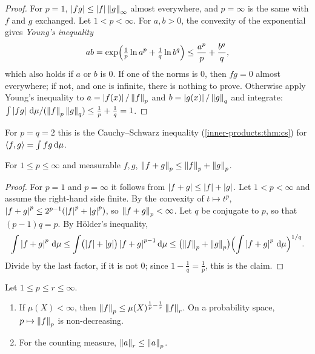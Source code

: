 \begin{notechapter}
\begin{proof}
For $p = 1$, $\left|fg\right|\leq\left|f\right|\left\|g\right\|_\infty$ almost everywhere, and
$p = \infty$ is the same with $f$ and $g$ exchanged. Let
$1 < p < \infty$. For $a, b > 0$, the convexity of the exponential
gives \emph{Young's inequality}
\[
  ab = \exp\Bigl(\tfrac1p\ln a^p + \tfrac1q\ln b^q\Bigr)
  \leq\frac{a^p}p + \frac{b^q}q ,
\]
which also holds if $a$ or $b$ is $0$. If one of the norms is $0$, then
$fg = 0$ almost everywhere; if not, and one is infinite, there is nothing
to prove. Otherwise apply Young's inequality to
$a = \left|f(x)\right|/\left\|f\right\|_p$ and $b = \left|g(x)\right|/\left\|g\right\|_q$ and integrate:
$\int\left|fg\right|\,\mathrm{d}\mu/(\left\|f\right\|_p\left\|g\right\|_q)\leq\frac1p + \frac1q = 1$.
\end{proof}

For $p = q = 2$ this is the Cauchy--Schwarz inequality
(\cref{inner-products:thm:cs}) for $\left\langle f, g \right\rangle = \int fg\,\mathrm{d}\mu$.

\begin{theorem}\label{lp-spaces:thm:minkowski}
For $1\leq p\leq\infty$ and measurable $f, g$,
$\left\|f + g\right\|_p\leq\left\|f\right\|_p + \left\|g\right\|_p$.
\end{theorem}

\begin{proof}
For $p = 1$ and $p = \infty$ it follows from
$\left|f + g\right|\leq\left|f\right| + \left|g\right|$. Let $1 < p < \infty$ and assume the
right-hand side finite. By the convexity of $t\mapsto t^p$,
$\left|f + g\right|^p\leq2^{p-1}(\left|f\right|^p + \left|g\right|^p)$, so
$\left\|f + g\right\|_p < \infty$. Let $q$ be conjugate to $p$, so that
$(p - 1)q = p$. By H\"older's inequality,
\[
  \int\left|f + g\right|^p\,\mathrm{d}\mu
  \leq\int\bigl(\left|f\right| + \left|g\right|\bigr)\left|f + g\right|^{p-1}\mathrm{d}\mu
  \leq\bigl(\left\|f\right\|_p + \left\|g\right\|_p\bigr)
      \Bigl(\int\left|f + g\right|^p\,\mathrm{d}\mu\Bigr)^{1/q} .
\]
Divide by the last factor, if it is not $0$; since $1 - \frac1q
= \frac1p$, this is the claim.
\end{proof}

\begin{proposition}\label{lp-spaces:prop:inclusion}
Let $1\leq p\leq r\leq\infty$.
\begin{enumerate}[nosep]
  \item If $\mu(X) < \infty$, then
        $\left\|f\right\|_p\leq\mu(X)^{\frac1p - \frac1r}\left\|f\right\|_r$. On a
        probability space, $p\mapsto\left\|f\right\|_p$ is non-decreasing.
  \item For the counting measure, $\left\|a\right\|_r\leq\left\|a\right\|_p$.
\end{enumerate}
\end{proposition}


\end{notechapter}
